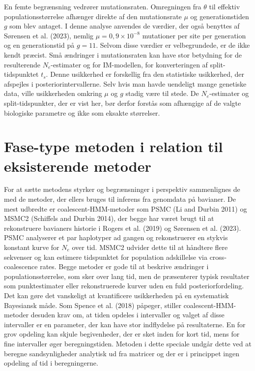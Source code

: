 \documentclass[
  10pt,
  a4paper,
]{scrbook}
\begin{document}
En femte begrænsning vedrører mutationsraten. Omregningen fra \(\theta\)
til effektiv populationsstørrelse afhænger direkte af den mutationsrate
\(\mu\) og generationstiden \(g\) som blev antaget. I denne analyse
anvendes de værdier, der også benyttes af {Sørensen et al.} (2023),
nemlig \(\mu = 0{,}9 \times 10^{-8}\) mutationer per site per generation
og en generationstid på \(g=11\). Selvom disse værdier er velbegrundede,
er de ikke kendt præcist. Små ændringer i mutationsraten kan have stor
betydning for de resulterende \(N_e\)-estimater og for IM-modellen, for
konverteringen af split-tidspunktet \(t_s\). Denne usikkerhed er
forskellig fra den statistiske usikkerhed, der afspejles i
posteriorintervallerne. Selv hvis man havde uendeligt mange genetiske
data, ville usikkerheden omkring \(\mu\) og \(g\) stadig være til stede.
De \(N_e\)-estimater og split-tidspunkter, der er vist her, bør derfor
forstås som afhængige af de valgte biologiske parametre og ikke som
eksakte størrelser.

\section{Fase-type metoden i relation til eksisterende
metoder}\label{fase-type-metoden-i-relation-til-eksisterende-metoder}

For at sætte metodens styrker og begrænsninger i perspektiv sammenlignes
de med de metoder, der ellers bruges til inferens fra genomdata på
bavianer. De mest udbredte er coalescent-HMM-metoder som PSMC (Li and
Durbin 2011) og MSMC2 (Schiffels and Durbin 2014), der begge har været
brugt til at rekonstruere bavianers historie i {Rogers et al.} (2019) og
{Sørensen et al.} (2023). PSMC analyserer et par haplotyper ad gangen og
rekonstruerer en stykvis konstant kurve for \(N_e\) over tid. MSMC2
udvider dette til at håndtere flere sekvenser og kan estimere
tidspunktet for population adskillelse via cross-coalescence rates.
Begge metoder er gode til at beskrive ændringer i populationsstørrelse,
som sker over lang tid, men de præsenterer typisk resultater som
punktestimater eller rekonstruerede kurver uden en fuld
posteriorfordeling. Det kan gøre det vanskeligt at kvantificere
usikkerheden på en systematisk Bayesiansk måde. Som Spence et al. (2018)
påpeger, stiller coalescent-HMM-metoder desuden krav om, at tiden
opdeles i intervaller og valget af disse intervaller er en parameter,
der kan have stor indflydelse på resultaterne. En for grov opdeling kan
skjule begivenheder, der er sket inden for kort tid, mens for fine
intervaller øger beregningstiden. Metoden i dette speciale undgår dette
ved at beregne sandsynligheder analytisk ud fra matricer og der er i
princippet ingen opdeling af tid i beregningerne.
\end{document}
